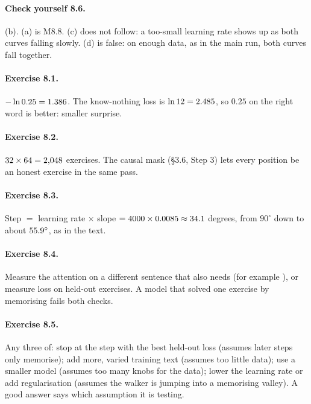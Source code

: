 \paragraph{Check yourself 8.6.} (b). (a) is M8.8. (c) does not follow: a too-small learning rate shows up as
both curves falling slowly. (d) is false: on enough data, as in the main run, both curves fall together.

\paragraph{Exercise 8.1.} $-\ln 0.25 = 1.386$. The know-nothing loss is $\ln 12 =
2.485$, so $0.25$ on the right word is better: smaller surprise.

\paragraph{Exercise 8.2.} $32\times64=2{,}048$ exercises. The causal mask (\S3.6, Step 3) lets
every position be an honest exercise in the same pass.

\paragraph{Exercise 8.3.} Step $=$ learning rate $\times$ slope $= 4000\times0.0085
\approx 34.1$ degrees, from $90^\circ$ down to about $55.9^\circ$, as in the text.

\paragraph{Exercise 8.4.} Measure the attention on a different sentence that also needs  (for
example ), or measure loss on held-out exercises. A model that solved one exercise by
memorising fails both checks.

\paragraph{Exercise 8.5.} Any three of: stop at the step with the best held-out loss (assumes later steps
only memorise); add more, varied training text (assumes too little data); use a smaller model (assumes too
many knobs for the data); lower the learning rate or add regularisation (assumes the walker is jumping into a
memorising valley). A good answer says which assumption it is testing.

